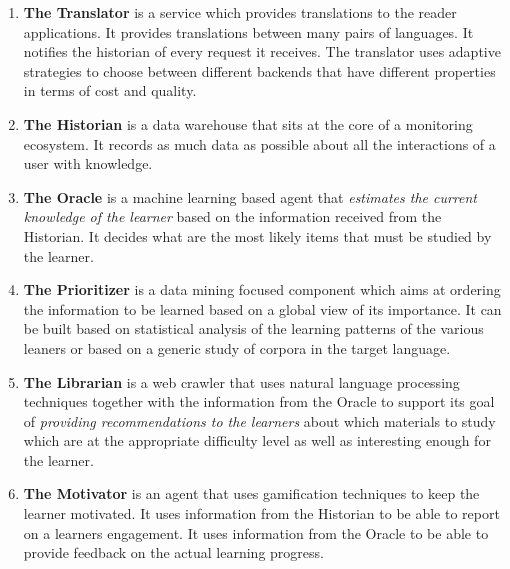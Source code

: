 \newcommand {\archiblock}[1]{\item {\bf #1}}
\begin{enumerate}

		\archiblock{The Translator} is a service which provides translations to the reader applications. It provides translations between many pairs of languages. It notifies the historian of every request it receives. 
		The translator uses adaptive strategies to choose between different backends that have different properties in terms of cost and quality.

		\archiblock{The Historian} is a data warehouse that sits at the core of a monitoring ecosystem. It records as much data as possible about all the interactions of a user with knowledge. 

		\archiblock{The Oracle} is a machine learning based agent that {\em estimates the current knowledge of the learner} based on the information received from the Historian. It decides what are the most likely items that must be studied by the learner. 
		\archiblock{The Prioritizer} is a data mining focused component which aims at ordering the information to be learned based on a global view of its importance. It can be built based on statistical analysis of the learning patterns of the various leaners or based on a generic study of corpora in the target language.


		\archiblock {The Librarian} is a web crawler that uses natural language processing techniques together with the information from the Oracle to support its goal of {\em providing recommendations to the learners} about which materials to study which are at the appropriate difficulty level as well as interesting enough for the learner.

		\archiblock {The Motivator} is an agent that uses gamification techniques to keep the learner motivated. It uses information from the Historian to be able to report on a learners engagement. It uses information from the Oracle to be able to provide feedback on the actual learning progress. 

\end{enumerate}





